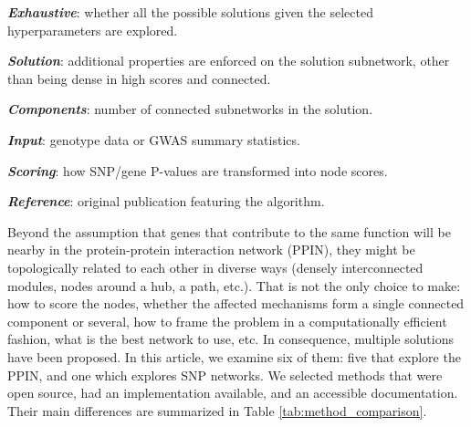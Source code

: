 \documentclass[twocolumn, 11pt, draft]{article}
\begin{document}
\begin{table}[htbp]
\begin{threeparttable}
\begin{tablenotes}
      \item \textbf{\emph{Exhaustive}}: whether all the possible solutions given the selected hyperparameters are explored.\\
      \item \textbf{\emph{Solution}}: additional properties are enforced on the solution subnetwork, other than being dense in high scores and connected.\\
      \item \textbf{\emph{Components}}: number of connected subnetworks in the solution.\\
      \item \textbf{\emph{Input}}: genotype data or GWAS summary statistics.\\
      \item \textbf{\emph{Scoring}}: how SNP/gene P-values are transformed into node scores.\\
      \item \textbf{\emph{Reference}}: original publication featuring the algorithm.
    \end{tablenotes}
  \end{threeparttable}
\end{table}

Beyond the assumption that genes that contribute to the same function will be nearby in the protein-protein interaction network (PPIN), they might be topologically related to each other in diverse ways (densely interconnected modules, nodes around a hub, a path, etc.). That is not the only choice to make: how to score the nodes, whether the affected mechanisms form a single connected component or several, how to frame the problem in a computationally efficient fashion, what is the best network to use, etc. In consequence, multiple solutions have been proposed. In this article, we examine six of them: five that explore the PPIN, and one which explores SNP networks. We selected methods that were open source, had an implementation available, and an accessible documentation. Their main differences are summarized in Table \ref{tab:method_comparison}.
\end{document}
